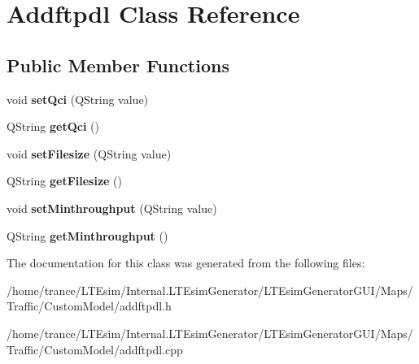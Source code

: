 \hypertarget{class_addftpdl}{}\section{Addftpdl Class Reference}
\label{class_addftpdl}
\subsection*{Public Member Functions}
\begin{DoxyCompactItemize}
\item 
void {\bfseries set\+Qci} (Q\+String value)\hypertarget{class_addftpdl_aa28113afd1eb26e955ed5cf69270b384}{}\label{class_addftpdl_aa28113afd1eb26e955ed5cf69270b384}

\item 
Q\+String {\bfseries get\+Qci} ()\hypertarget{class_addftpdl_a1cc593949c942ead587cf23ea8640905}{}\label{class_addftpdl_a1cc593949c942ead587cf23ea8640905}

\item 
void {\bfseries set\+Filesize} (Q\+String value)\hypertarget{class_addftpdl_aa593b4122d5eac0d527bc62245d87c31}{}\label{class_addftpdl_aa593b4122d5eac0d527bc62245d87c31}

\item 
Q\+String {\bfseries get\+Filesize} ()\hypertarget{class_addftpdl_a4fe91603ac80d13f0dceeb089a6eab60}{}\label{class_addftpdl_a4fe91603ac80d13f0dceeb089a6eab60}

\item 
void {\bfseries set\+Minthroughput} (Q\+String value)\hypertarget{class_addftpdl_aee3128f9ee8ee9493ee170bb04d0876a}{}\label{class_addftpdl_aee3128f9ee8ee9493ee170bb04d0876a}

\item 
Q\+String {\bfseries get\+Minthroughput} ()\hypertarget{class_addftpdl_a419c7f361db5f9a78dc6ef54657c24b3}{}\label{class_addftpdl_a419c7f361db5f9a78dc6ef54657c24b3}

\end{DoxyCompactItemize}


The documentation for this class was generated from the following files\+:\begin{DoxyCompactItemize}
\item 
/home/trance/\+L\+T\+Esim/\+Internal.\+L\+T\+Esim\+Generator/\+L\+T\+Esim\+Generator\+G\+U\+I/\+Maps/\+Traffic/\+Custom\+Model/addftpdl.\+h\item 
/home/trance/\+L\+T\+Esim/\+Internal.\+L\+T\+Esim\+Generator/\+L\+T\+Esim\+Generator\+G\+U\+I/\+Maps/\+Traffic/\+Custom\+Model/addftpdl.\+cpp\end{DoxyCompactItemize}
